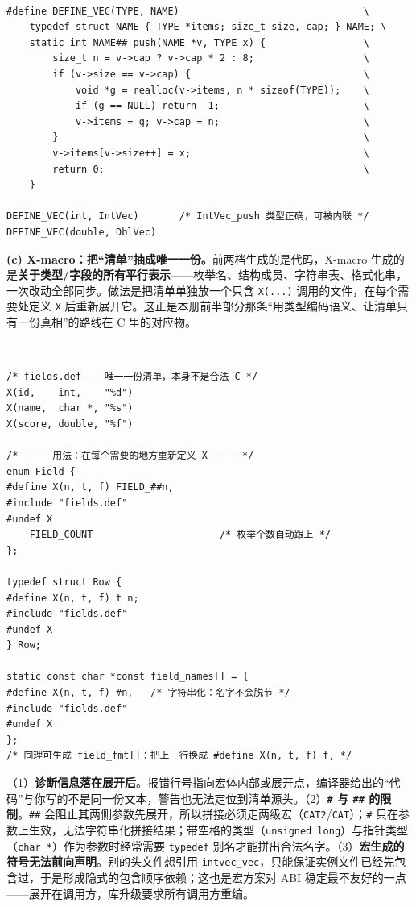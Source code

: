 \documentclass[12pt,a4paper,fontset=fandol]{ctexbook}
\newcommand{\clabel}{%
  \tcbox[on line,colback=cheadbg,colframe=cheadbg,
    boxrule=0pt,arc=1pt,left=2pt,right=2pt,top=1pt,bottom=1pt,
    colupper=white,fontupper=\scriptsize\bfseries]{C}}
\newcommand{\kw}[1]{\texttt{#1}}
\begin{document}
\clabel\ \begin{lstlisting}[style=cstyle,caption={把整个类型定义塞进一个宏：能跑，但最难维护}]
#define DEFINE_VEC(TYPE, NAME)                                \
    typedef struct NAME { TYPE *items; size_t size, cap; } NAME; \
    static int NAME##_push(NAME *v, TYPE x) {                 \
        size_t n = v->cap ? v->cap * 2 : 8;                   \
        if (v->size == v->cap) {                              \
            void *g = realloc(v->items, n * sizeof(TYPE));    \
            if (g == NULL) return -1;                         \
            v->items = g; v->cap = n;                         \
        }                                                     \
        v->items[v->size++] = x;                              \
        return 0;                                             \
    }

DEFINE_VEC(int, IntVec)       /* IntVec_push 类型正确，可被内联 */
DEFINE_VEC(double, DblVec)
\end{lstlisting}

\textbf{(c) X-macro：把“清单”抽成唯一一份。}前两档生成的是代码，X-macro 生成的是\textbf{关于类型/字段的所有平行表示}——枚举名、结构成员、字符串表、格式化串，一次改动全部同步。做法是把清单单独放一个只含 \kw{X(...)} 调用的文件，在每个需要处定义 \kw{X} 后重新展开它。这正是本册前半部分那条“用类型编码语义、让清单只有一份真相”的路线在 C 里的对应物。

\clabel\ \begin{lstlisting}[style=cstyle,caption={X-macro：一份清单同时生成枚举、结构成员与字符串表}]
/* fields.def -- 唯一一份清单，本身不是合法 C */
X(id,    int,    "%d")
X(name,  char *, "%s")
X(score, double, "%f")

/* ---- 用法：在每个需要的地方重新定义 X ---- */
enum Field {
#define X(n, t, f) FIELD_##n,
#include "fields.def"
#undef X
    FIELD_COUNT                      /* 枚举个数自动跟上 */
};

typedef struct Row {
#define X(n, t, f) t n;
#include "fields.def"
#undef X
} Row;

static const char *const field_names[] = {
#define X(n, t, f) #n,   /* 字符串化：名字不会脱节 */
#include "fields.def"
#undef X
};
/* 同理可生成 field_fmt[]：把上一行换成 #define X(n, t, f) f, */
\end{lstlisting}

\begin{note}[title={宏方案绕不开的三个硬伤}]
（1）\textbf{诊断信息落在展开后}。报错行号指向宏体内部或展开点，编译器给出的“代码”与你写的不是同一份文本，警告也无法定位到清单源头。（2）\textbf{\kw{\#} 与 \kw{\#\#} 的限制}。\kw{\#\#} 会阻止其两侧参数先展开，所以拼接必须走两级宏（\kw{CAT2}/\kw{CAT}）；\kw{\#} 只在参数上生效，无法字符串化拼接结果；带空格的类型（\kw{unsigned long}）与指针类型（\kw{char *}）作为参数时经常需要 \kw{typedef} 别名才能拼出合法名字。（3）\textbf{宏生成的符号无法前向声明}。别的头文件想引用 \kw{intvec\_vec}，只能保证实例文件已经先包含过，于是形成隐式的包含顺序依赖；这也是宏方案对 ABI 稳定最不友好的一点——展开在调用方，库升级要求所有调用方重编。
\end{note}
\end{document}
